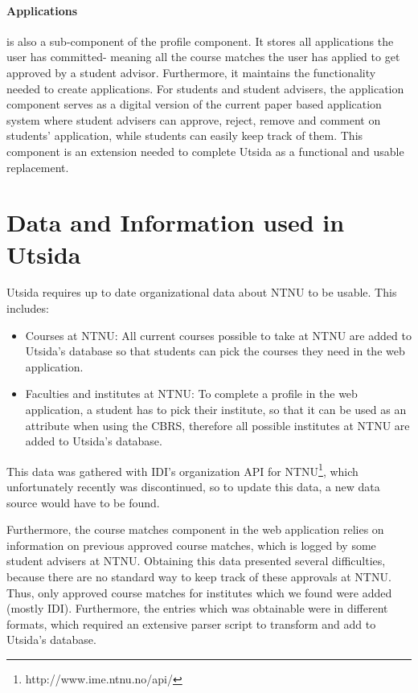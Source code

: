 \paragraph{Applications} is also a sub-component of the profile component. It stores all applications the user has committed- meaning all the course matches the user has applied to get approved by a student advisor. Furthermore, it maintains the functionality needed to create applications. For students and student advisers, the application component serves as a digital version of the current paper based application system where student advisers can approve, reject, remove and comment on students' application, while students can easily keep track of them. This component is an extension needed to complete Utsida as a functional and usable replacement.


\section{Data and Information used in Utsida}
Utsida requires up to date organizational data about NTNU to be usable. This includes:

\begin{itemize}
    \item Courses at NTNU: All current courses possible to take at NTNU are added to Utsida's database so that students can pick the courses they need in the web application.
    \item Faculties and institutes at NTNU: To complete a profile in the web application, a student has to pick their institute, so that it can be used as an attribute when using the CBRS, therefore all possible institutes at NTNU are added to Utsida's database.
\end{itemize}

This data was gathered with IDI's organization API for NTNU\footnote{http://www.ime.ntnu.no/api/}, which unfortunately recently was discontinued, so to update this data, a new data source would have to be found. 

Furthermore, the course matches component in the web application relies on information on previous approved course matches, which is logged by some student advisers at NTNU. Obtaining this data presented several difficulties, because there are no standard way to keep track of these approvals at NTNU. Thus, only approved course matches for institutes which we found were added (mostly IDI). Furthermore, the entries which was obtainable were in different formats, which required an extensive parser script to transform and add to Utsida's database.

